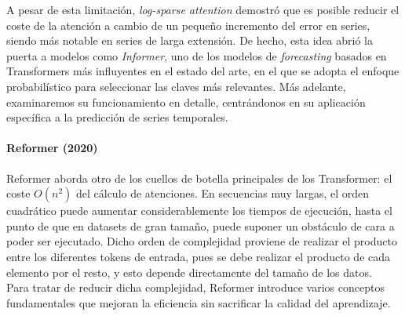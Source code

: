 A pesar de esta limitación, \textit{log-sparse attention} demostró que es posible reducir el coste de la atención a cambio de un pequeño incremento del error en series, siendo más notable en series de larga extensión. De hecho, esta idea abrió la puerta a modelos como \textit{Informer}, uno de los modelos de \textit{forecasting} basados en Transformers más influyentes en el estado del arte,  en el que se adopta el enfoque probabilístico para seleccionar las claves más relevantes. Más adelante, examinaremos su funcionamiento en detalle, centrándonos en su aplicación específica a la predicción de series temporales.

\paragraph{Reformer (2020)}

Reformer \cite{kitaev2020reformerefficienttransformer} aborda otro de los cuellos de botella principales de los Transformer: el coste $O(n^2)$ del cálculo de atenciones. En secuencias muy largas, el orden cuadrático puede aumentar considerablemente los tiempos de ejecución, hasta el punto de que en datasets de gran tamaño, puede suponer un obstáculo de cara a poder ser ejecutado. Dicho orden de complejidad proviene de realizar el producto entre los diferentes tokens de entrada, pues se debe realizar el producto de cada elemento por el resto, y esto depende directamente del tamaño de los datos.\\


Para tratar de reducir dicha complejidad, Reformer introduce varios conceptos fundamentales que mejoran la eficiencia sin sacrificar la calidad del aprendizaje.

